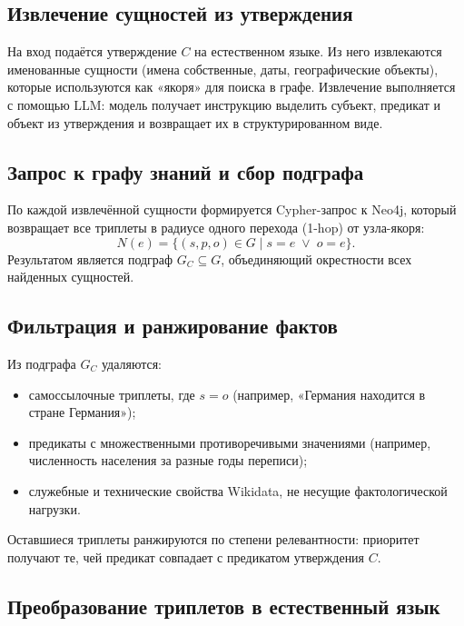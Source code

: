 \documentclass{misisarticle}
\begin{document}
\subsection{Извлечение сущностей из утверждения}

На вход подаётся утверждение $C$ на естественном языке.
Из него извлекаются именованные сущности
(имена собственные, даты, географические объекты),
которые используются как «якоря» для поиска в графе.
Извлечение выполняется с помощью LLM:
модель получает инструкцию выделить субъект, предикат
и объект из утверждения и возвращает их в структурированном виде.

\subsection{Запрос к графу знаний и сбор подграфа}

По каждой извлечённой сущности формируется Cypher-запрос
к Neo4j, который возвращает все триплеты в радиусе
одного перехода (1-hop) от узла-якоря:
\begin{equation}
  N(e) = \{(s, p, o) \in G \mid s = e \;\lor\; o = e\}.
  \label{eq:neighborhood}
\end{equation}
Результатом является подграф $G_C \subseteq G$,
объединяющий окрестности всех найденных сущностей.

\subsection{Фильтрация и ранжирование фактов}

Из подграфа $G_C$ удаляются:
\begin{itemize}
  \item самоссылочные триплеты, где $s = o$
    (например, «Германия находится в стране Германия»);
  \item предикаты с множественными противоречивыми значениями
    (например, численность населения за разные годы переписи);
  \item служебные и технические свойства Wikidata,
    не несущие фактологической нагрузки.
\end{itemize}
Оставшиеся триплеты ранжируются по степени релевантности:
приоритет получают те, чей предикат совпадает
с предикатом утверждения $C$.

\subsection{Преобразование триплетов в естественный язык}
\end{document}
